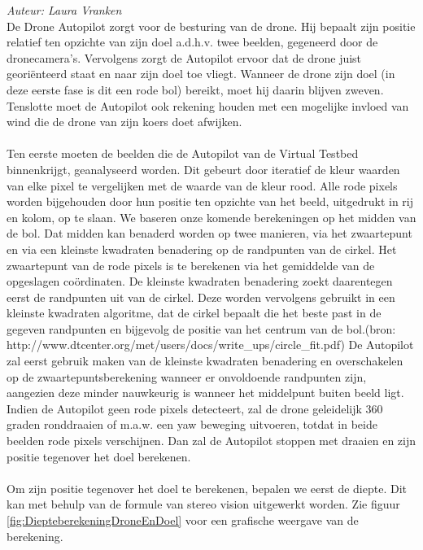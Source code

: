 {\em Auteur: Laura Vranken}\\

\noindent
De Drone Autopilot zorgt voor de besturing van de drone. Hij bepaalt zijn positie relatief ten opzichte van zijn doel a.d.h.v. twee beelden, gegeneerd door de dronecamera's. Vervolgens zorgt de Autopilot ervoor dat de drone juist geori\"enteerd staat en naar zijn doel toe vliegt. Wanneer de drone zijn doel (in deze eerste fase is dit een rode bol) bereikt, moet hij daarin blijven zweven. Tenslotte moet de Autopilot ook rekening houden met een mogelijke invloed van wind die de drone van zijn koers doet afwijken.
\\
\\
Ten eerste moeten de beelden die de Autopilot van de Virtual Testbed binnenkrijgt, geanalyseerd worden. Dit gebeurt door iteratief de kleur waarden van elke pixel te vergelijken met de waarde van de kleur rood. Alle rode pixels worden bijgehouden door hun positie ten opzichte van het beeld, uitgedrukt in rij en kolom, op te slaan. We baseren onze komende berekeningen op het midden van de bol. Dat midden kan benaderd worden op twee manieren, via het zwaartepunt en via een kleinste kwadraten benadering op de randpunten van de cirkel. Het zwaartepunt van de rode pixels is te berekenen via het gemiddelde van de opgeslagen co\"ordinaten. De kleinste kwadraten benadering zoekt daarentegen eerst de randpunten uit van de cirkel. Deze worden vervolgens gebruikt in een kleinste kwadraten algoritme, dat de cirkel bepaalt die het beste past in de gegeven randpunten en bijgevolg de positie van het centrum van de bol.(bron: http://www.dtcenter.org/met/users/docs/write_ups/circle_fit.pdf) De Autopilot zal eerst gebruik maken van de kleinste kwadraten benadering en overschakelen op de zwaartepuntsberekening wanneer er onvoldoende randpunten zijn, aangezien deze minder nauwkeurig is wanneer het middelpunt buiten beeld ligt.
\\
Indien de Autopilot geen rode pixels detecteert, zal de drone geleidelijk 360 graden ronddraaien of m.a.w. een yaw beweging uitvoeren, totdat in beide beelden rode pixels verschijnen. Dan zal de Autopilot stoppen met draaien en zijn positie tegenover het doel berekenen.
\\
\\
Om zijn positie tegenover het doel te berekenen, bepalen we eerst de diepte. Dit kan met behulp van de formule van stereo vision \cite{website:techbriefs} uitgewerkt worden. Zie figuur \ref{fig:DiepteberekeningDroneEnDoel} voor een grafische weergave van de berekening.
